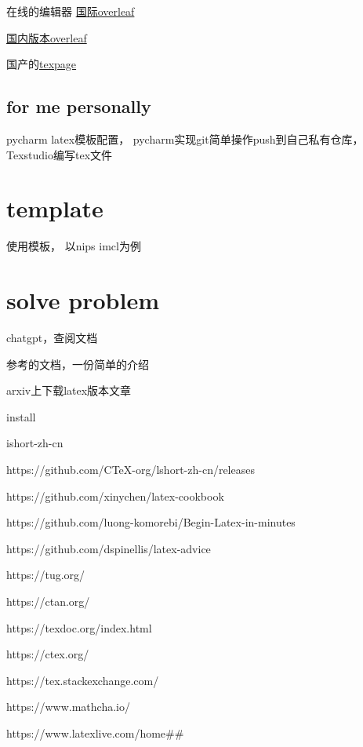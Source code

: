 \documentclass[11pt]{ctexart}
\begin{document}
 在线的编辑器 \href{www.overleaf.com}{国际overleaf}
 
 \href{cn.overleaf.com}{国内版本overleaf}
 
 国产的\href{www.texpage.com}{texpage}
 
 
 \subsection{for me personally}
 
 pycharm latex模板配置， pycharm实现git简单操作push到自己私有仓库，Texstudio编写tex文件
 
 \section{template}

使用模板， 以nips imcl为例


\section{solve problem}

 chatgpt，查阅文档

参考的文档，一份简单的介绍

arxiv上下载latex版本文章

install







ishort-zh-cn

https://github.com/CTeX-org/lshort-zh-cn/releases

https://github.com/xinychen/latex-cookbook

https://github.com/luong-komorebi/Begin-Latex-in-minutes

https://github.com/dspinellis/latex-advice

https://tug.org/

https://ctan.org/

https://texdoc.org/index.html

https://ctex.org/

https://tex.stackexchange.com/

https://www.mathcha.io/

https://www.latexlive.com/home\#\#
\end{document}
